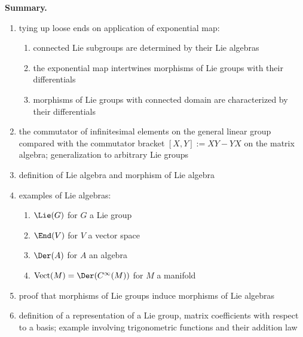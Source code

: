 \documentclass[reqno]{amsart} 
\begin{document}
\textbf{Summary.}
\begin{enumerate}
\item tying up loose ends on application of exponential map:
  \begin{enumerate}
  \item connected Lie subgroups are determined by their Lie algebras
  \item the exponential map intertwines morphisms of Lie groups with their differentials
  \item morphisms of Lie groups with connected domain are characterized by their differentials
  \end{enumerate}
\item the commutator of infinitesimal elements on the general linear group compared with the commutator bracket \([X,Y] := X Y - Y X\) on the matrix algebra; generalization to arbitrary Lie groups
\item definition of Lie algebra and morphism of Lie algebra
\item examples of Lie algebras:
  \begin{enumerate}
  \item \(\Lie(G)\) for \(G\) a Lie group
  \item \(\End(V)\) for \(V\) a vector space
  \item \(\Der(A)\) for \(A\) an algebra
  \item \(\operatorname{Vect}(M) = \Der(C^\infty(M))\) for \(M\) a manifold
  \end{enumerate}
\item proof that morphisms of Lie groups induce morphisms of Lie algebras
\item definition of a representation of a Lie group, matrix coefficients with respect to a basis; example involving trigonometric functions and their addition law
\end{enumerate}
\end{document}
